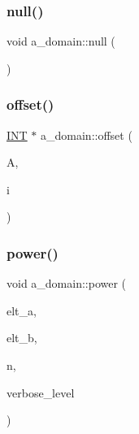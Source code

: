 \mbox{\label{classa__domain_ae71217e1effae4133049e384af04985b}} 
\subsubsection{\texorpdfstring{null()}{null()}}
{\footnotesize\ttfamily void a\+\_\+domain\+::null (\begin{DoxyParamCaption}{ }\end{DoxyParamCaption})}

\mbox{\label{classa__domain_a62f150e399aec130df913d65a7772ff3}} 
\subsubsection{\texorpdfstring{offset()}{offset()}}
{\footnotesize\ttfamily \mbox{\hyperlink{galois_8h_a09fddde158a3a20bd2dcadb609de11dc}{I\+NT}} $\ast$ a\+\_\+domain\+::offset (\begin{DoxyParamCaption}\item[{\mbox{\hyperlink{galois_8h_a09fddde158a3a20bd2dcadb609de11dc}{I\+NT}} $\ast$}]{A,  }\item[{\mbox{\hyperlink{galois_8h_a09fddde158a3a20bd2dcadb609de11dc}{I\+NT}}}]{i }\end{DoxyParamCaption})}

\mbox{\label{classa__domain_ac4ce9e8dc4ce621fa15ec46c2cc2066d}} 
\subsubsection{\texorpdfstring{power()}{power()}}
{\footnotesize\ttfamily void a\+\_\+domain\+::power (\begin{DoxyParamCaption}\item[{\mbox{\hyperlink{galois_8h_a09fddde158a3a20bd2dcadb609de11dc}{I\+NT}} $\ast$}]{elt\+\_\+a,  }\item[{\mbox{\hyperlink{galois_8h_a09fddde158a3a20bd2dcadb609de11dc}{I\+NT}} $\ast$}]{elt\+\_\+b,  }\item[{\mbox{\hyperlink{galois_8h_a09fddde158a3a20bd2dcadb609de11dc}{I\+NT}}}]{n,  }\item[{\mbox{\hyperlink{galois_8h_a09fddde158a3a20bd2dcadb609de11dc}{I\+NT}}}]{verbose\+\_\+level }\end{DoxyParamCaption})}

